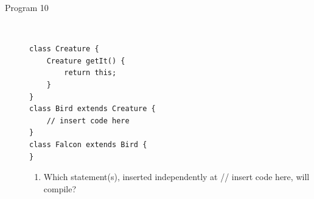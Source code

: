 \documentclass[11pt,a4paper]{article}
\def\AnswerBox{\fbox{\begin{minipage}{4in}\hfill\vspace{0.5in}\end{minipage}}}
\begin{document}
\begin{description}
\item [Program 10] \
\begin{lstlisting}
class Creature {
    Creature getIt() {
        return this;
    }
}
class Bird extends Creature {
    // insert code here
}
class Falcon extends Bird {
}
\end{lstlisting}

\AnswerBox

\begin{enumerate}[label=\bfseries Q\arabic*:]\itemsep10pt
\item Which statement(s), inserted independently at // insert code here, will compile?
\end{enumerate}

\end{description}
\end{document}
